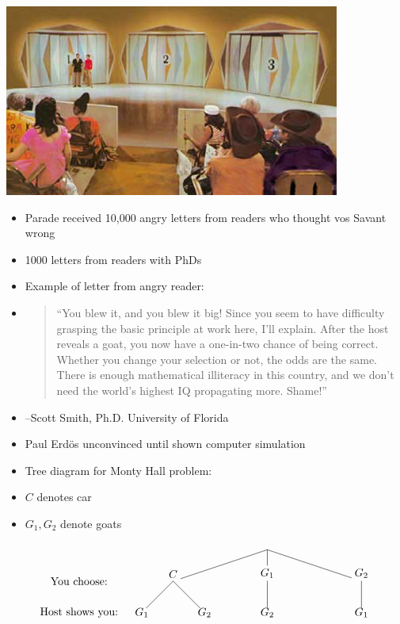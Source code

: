 \documentclass[handout]{beamer}
\theoremstyle{definition}
\begin{document}
\begin{frame}
\begin{center}\includegraphics[scale=.5]{Doors}\end{center}
\begin{itemize}
\item Parade received 10,000 angry letters from readers who thought
vos Savant wrong
\item 1000 letters from readers with PhDs
\end{itemize}
\end{frame}

\begin{frame}
\begin{itemize}
\item Example of letter from angry reader:
\item\begin{quotation}
``You blew it, and you blew it big! Since you seem to have difficulty
grasping the basic principle at work here, I'll explain. After the
host reveals a goat, you now have a one-in-two chance of being
correct. Whether you change your selection or not, the odds are the
same. There is enough mathematical illiteracy in this country, and
we don't need the world's highest IQ propagating more. Shame!''
\end{quotation}
\item[] --Scott Smith, Ph.D. University of Florida
\item Paul Erd\"os unconvinced until shown computer simulation
\end{itemize}
\end{frame}

\begin{frame}
\begin{itemize}
\item Tree diagram for Monty Hall problem:
\item \alert{$C$} denotes car
\item \alert{$G_1,G_2$} denote goats
\end{itemize}
\[\begin{xy}<1cm,0cm>:
(-6,-1)*{\text{You choose:}};
(-6,-2)*{\text{Host shows you:}};
(0,0)="0";
(-3,-1)="-31";
(0,-1)="01";
(3,-1)="31";
"0";"-31"*+!D{C}**\dir{-};
"0";"01"*+!D{G_1}**\dir{-};
"0";"31"*+!D{G_2}**\dir{-};
"-31";(-4,-2)*{G_1}**\dir{-};
"-31";(-2,-2)*{G_2}**\dir{-};
"01";(0,-2)*{G_2}**\dir{-};
"31";(3,-2)*{G_1}**\dir{-};
\end{xy}\]
\end{frame}
\end{document}
